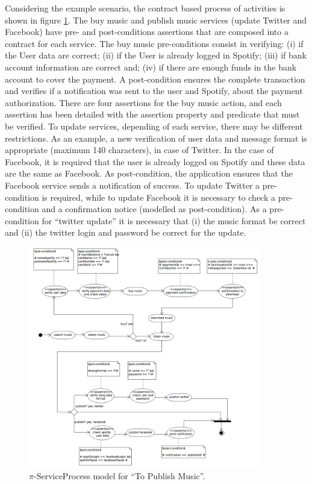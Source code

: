 \begin{example}\label{ex:toPublicMusic3}
Considering the example scenario, the contract based process of activities  is shown in figure \ref{fig:CIM:serviceprocess}. The buy music and publish music services (update Twitter and Facebook) have pre- and post-conditions assertions that are composed into a contract for each service. The buy music pre-conditions consist in verifying: 
(i) if the User data are correct; 
(ii) if the User is already logged in Spotify; 
(iii) if bank account information are correct and; 
(iv) if there are enough funds in the bank account to cover the payment. 
A post-condition ensures the complete transaction and verifies if a notification was sent to the user and Spotify, about the payment authorization. There are four assertions for the buy music action, and each assertion has been detailed with the assertion property and predicate that must be verified. To update services, depending of each service, there may be different restrictions. As an example, a new verification of user data and message format is appropriate (maximum 140 characters), in case of Twitter. In the case of Facebook, it is required that the user is already logged on Spotify and these data are the same as Facebook. 
As post-condition, the application ensures that the Facebook service sends a notification of success. 
To update Twitter a pre-condition is required, while to update Facebook it is necessary to check a pre-condition and a confirmation notice (modelled as post-condition). 
As a pre-condition for ``twitter update'' it is necessary that (i) the music format be correct and (ii) the twitter login and password be correct for the update.
\end{example}

\begin{figure}[htpb]
\center
\includegraphics[width=0.9\textwidth]{figs/ServiceProcess.pdf}
\caption{\label{fig:CIM:serviceprocess} $\pi$-ServiceProcess model for ``To Publish Music''.}
\end{figure}


